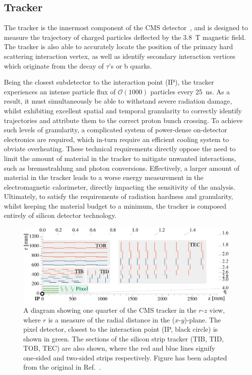 \subsection{Tracker}\label{sec:cms_tracker}
The tracker is the innermost component of the CMS detector~\cite{}, and is designed to measure the trajectory of charged particles deflected by the 3.8~T magnetic field. The tracker is also able to accurately locate the position of the primary hard scattering interaction vertex, as well as identify secondary interaction vertices which originate from the decay of $\tau$'s or b quarks. 

Being the closest subdetector to the interaction point (IP), the tracker experiences an intense particle flux of $\mathcal{O}(1000)$ particles every 25~ns. As a result, it must simultaneously be able to withstand severe radiation damage, whilst exhibiting excellent spatial and temporal granularity to correctly identify trajectories and attribute them to the correct proton bunch crossing. To achieve such levels of granularity, a complicated system of power-dense on-detector electronics are required, which in-turn require an efficient cooling system to obviate overheating. These technical requirements directly oppose the need to limit the amount of material in the tracker to mitigate unwanted interactions, such as bremsstrahlung and photon conversions. Effectively, a larger amount of material in the tracker leads to a worse energy measurement in the electromagnetic calorimeter, directly impacting the sensitivity of the \Hgg analysis. Ultimately, to satisfy the requirements of radiation hardness and granularity, whilst keeping the material budget to a minimum, the tracker is composed entirely of silicon detector technology.

\begin{figure}[htb!]
  \centering
  \includegraphics[width=1\textwidth]{Figures/cms/tracker.pdf}
  \caption[The CMS silicon tracker]
  {
    A diagram showing one quarter of the CMS tracker in the $r$-$z$ view, where $r$ is a measure of the radial distance in the ($x$-$y$)-plane. The pixel detector, closest to the interaction point (IP, black circle) is shown in green. The sections of the silicon strip tracker (TIB, TID, TOB, TEC) are also shown, where the red and blue lines signify one-sided and two-sided strips respectively. Figure has been adapted from the original in Ref.~\cite{CERN-LHCC-2017-009}.
  }
  \label{fig:cms_tracker}
\end{figure}


